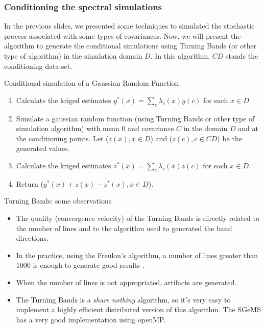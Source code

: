\begin{frame}
\frametitle{Conditioning the spectral simulations}
 In the previous slides, we presented some techniques to simulated the stochastic process associated with some types of covariances. Now,
 we will present the algorithm to generate the conditional simulations using Turning Bands (or other type of algorithm)
 in the simulation domain $D$. 
 In this algorithm, $CD$ stands the conditioning data-set.
 
\begin{block}{Conditional simulation of a Gaussian Random Function}
 \begin{enumerate}
  \item Calculate the kriged estimates $y^{*}(x)=\sum_c\lambda_c(x)y(c)$ for each $x \in D$.
  \item Simulate a gaussian random function (using Turning Bands or other type of simulation algorithm) with mean $0$ and covariance $C$
  in the domain $D$ and at the conditioning points. Let ($z(x), x \in D$) and ($z(c), c \in CD$) be the generated values.
  \item Calculate the kriged estimates $z^{*}(x) = \sum_c\lambda_c(x)z(c)$ for each $x \in D$.
  \item Return ($y^{*}(x) + z(x) - z^{*}(x), x \in D$).
 \end{enumerate}

\end{block}

\end{frame}


\begin{frame}{Turning Bands: some observations}
 \begin{itemize}
  \item The quality (convergence velocity) of the Turning Bands is directly related to the number of lines and to the algorithm
  used to generated the band directions.
  \item In the practice, using the Freulon's algorithm, a number of lines greater than 1000 is enough to generate good results \cite{emery2006tbsim}.
  \item When the number of lines is not appropriated, artifacts are generated.
  \item The Turning Bands is a \textit{share nothing} algorithm, so it's very easy to implement a highly efficient distributed version
  of this algorithm. The SGeMS has a very good implementation using openMP.
 \end{itemize}
\end{frame}


